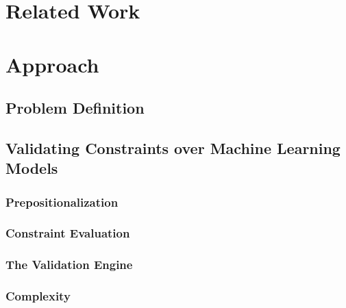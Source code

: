 \documentclass[11pt,a4paper, DIV=12]{report}
\begin{document}
\chapter{Related Work}
    \label{section_related_work}
    

\chapter{Approach}
    \label{section_approach}   
    
    
    \section{Problem Definition}
        \label{section_problem_definition}
        

    \section{Validating Constraints over Machine Learning Models}
        \label{section_validating_constraints}
        
        
    
        \subsection{Prepositionalization}
            \label{section_propositionalization}
            
            
        \subsection{Constraint Evaluation}
            \label{section_evaluating_constraints}
            
        
        \subsection{The Validation Engine}
            \label{section_validation_engine}
            
        \subsection{Complexity}
            \label{section_validation_engine_complexity}
            
    
\end{document}
